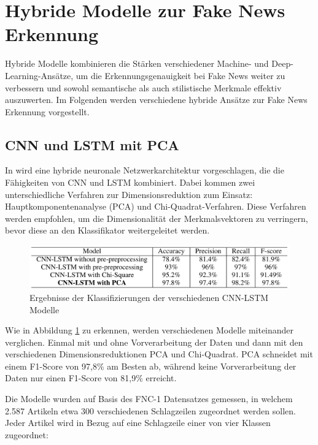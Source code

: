 \section{Hybride Modelle zur Fake News Erkennung}
\label{sec:hybride_modelle}

Hybride Modelle kombinieren die Stärken verschiedener Machine- und Deep-Learning-Ansätze, um die Erkennungsgenauigkeit bei Fake News weiter 
zu verbessern und sowohl semantische als auch stilistische Merkmale effektiv auszuwerten.  
Im Folgenden werden verschiedene hybride Ansätze zur Fake News Erkennung vorgestellt.


\subsection{CNN und LSTM mit PCA}

In \cite{umer2020} wird eine hybride neuronale Netzwerkarchitektur vorgeschlagen, die die Fähigkeiten von CNN und 
LSTM kombiniert. Dabei kommen zwei unterschiedliche Verfahren zur Dimensionsreduktion zum Einsatz: 
Hauptkomponentenanalyse (PCA) und Chi-Quadrat-Verfahren. 
Diese Verfahren werden empfohlen, um die Dimensionalität der 
Merkmalsvektoren zu verringern, bevor diese an den Klassifikator weitergeleitet werden.

\begin{figure}[htbp]
    \begin{center}
    \includegraphics[scale=0.4]{static/cnn_lstm_pca.png}
    \caption{\label{fig:cnn_lstm_pca} Ergebnisse der Klassifizierungen der verschiedenen CNN-LSTM Modelle \cite{umer2020}}
    \end{center}
\end{figure}

Wie in Abbildung \ref{fig:cnn_lstm_pca} zu erkennen, werden verschiedenen Modelle miteinander verglichen. Einmal mit und ohne Vorverarbeitung
der Daten und dann mit den verschiedenen Dimensionsreduktionen PCA und Chi-Quadrat.
PCA schneidet mit einem F1-Score von 97,8\% am Besten ab, während keine Vorverarbeitung der Daten nur einen F1-Score von 81,9\% erreicht.

Die Modelle wurden auf Basis des FNC-1 Datensatzes gemessen, in welchem 2.587 Artikeln etwa 300 verschiedenen Schlagzeilen zugeordnet werden sollen.
Jeder Artikel wird in Bezug auf eine Schlagzeile einer von vier Klassen zugeordnet:

